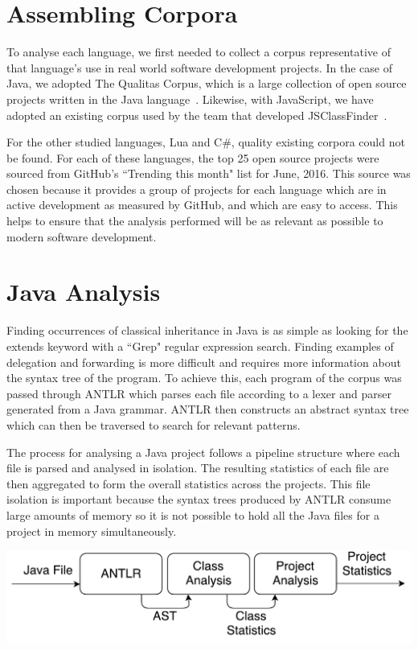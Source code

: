 \section{Assembling Corpora}
To analyse each language, we first needed to collect a corpus representative of that language's use in real world software development projects. In the case of Java, we adopted The Qualitas Corpus, which is a large collection of open source projects written in the Java language~\cite{QualitasCorpus}. Likewise, with JavaScript, we have adopted an existing corpus used by the team that developed JSClassFinder~\cite{JSClassFinder}.
\newline

For the other studied languages, Lua and C\#, quality existing corpora could not be found. For each of these languages, the top 25 open source projects were sourced from GitHub's ``Trending this month" list for June, 2016. This source was chosen because it provides a group of projects for each language which are in active development as measured by GitHub, and which are easy to access. This helps to ensure that the analysis performed will be as relevant as possible to modern software development.

\section{Java Analysis}
Finding occurrences of classical inheritance in Java is as simple as looking for the extends keyword with a ``Grep" regular expression search. Finding examples of delegation and forwarding is more difficult and requires more information about the syntax tree of the program. To achieve this, each program of the corpus was passed through ANTLR which parses each file according to a lexer and parser generated from a Java grammar. ANTLR then constructs an abstract syntax tree which can then be traversed to search for relevant patterns.
\newline

The process for analysing a Java project follows a pipeline structure where each file is parsed and analysed in isolation. The resulting statistics of each file are then aggregated to form the overall statistics across the projects. This file isolation is important because the syntax trees produced by ANTLR consume large amounts of memory so it is not possible to hold all the Java files for a project in memory simultaneously.
\newline

\begin{center}
	\includegraphics[scale=0.70]{AntlrPipeline.pdf}
\end{center}

